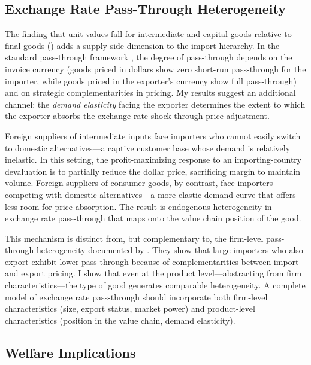 \documentclass[12pt]{article}
\begin{document}
\subsection{Exchange Rate Pass-Through Heterogeneity}

The finding that unit values fall for intermediate and capital goods relative to final goods () adds a supply-side dimension to the import hierarchy. In the standard pass-through framework \citep{gopinath2010currency}, the degree of pass-through depends on the invoice currency (goods priced in dollars show zero short-run pass-through for the importer, while goods priced in the exporter's currency show full pass-through) and on strategic complementarities in pricing. My results suggest an additional channel: the \textit{demand elasticity} facing the exporter determines the extent to which the exporter absorbs the exchange rate shock through price adjustment.

Foreign suppliers of intermediate inputs face importers who cannot easily switch to domestic alternatives---a captive customer base whose demand is relatively inelastic. In this setting, the profit-maximizing response to an importing-country devaluation is to partially reduce the dollar price, sacrificing margin to maintain volume. Foreign suppliers of consumer goods, by contrast, face importers competing with domestic alternatives---a more elastic demand curve that offers less room for price absorption. The result is endogenous heterogeneity in exchange rate pass-through that maps onto the value chain position of the good.

This mechanism is distinct from, but complementary to, the firm-level pass-through heterogeneity documented by \citet{amiti2014importers}. They show that large importers who also export exhibit lower pass-through because of complementarities between import and export pricing. I show that even at the product level---abstracting from firm characteristics---the type of good generates comparable heterogeneity. A complete model of exchange rate pass-through should incorporate both firm-level characteristics (size, export status, market power) and product-level characteristics (position in the value chain, demand elasticity).

\subsection{Welfare Implications}
\end{document}
